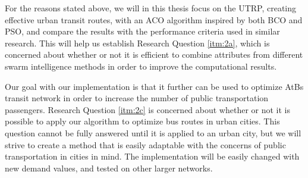 For the reasons stated above, we will in this thesis focus on the UTRP, creating effective urban transit routes, with an ACO algorithm inspired by both BCO and PSO, and compare the results with the performance criteria used in similar research. This will help us establish Research Question \vref{itm:2a}, which is concerned about whether or not it is efficient to combine attributes from different swarm intelligence methods in order to improve the computational results.

Our goal with our implementation is that it further can be used to optimize AtBs transit network in order to increase the number of public transportation passengers. Research Question \vref{itm:2c} is concerned about whether or not it is possible to apply our algorithm to optimize bus routes in urban cities. This question cannot be fully answered until it is applied to an urban city, but we will strive to create a method that is easily adaptable with the concerns of public transportation in cities in mind. The implementation will be easily changed with new demand values, and tested on other larger networks.


